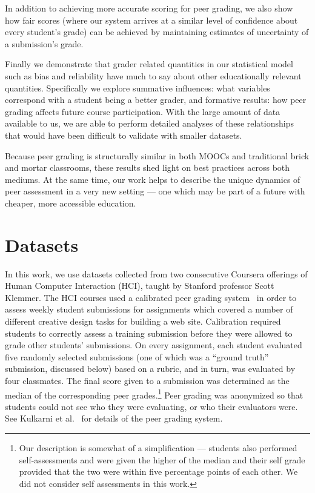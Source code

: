 In addition to achieving more accurate scoring for peer grading, we also show how fair scores
(where our system arrives at a similar level of confidence about every student's grade)
can be achieved by maintaining estimates of uncertainty of a submission's grade.

Finally we demonstrate that grader related quantities in our statistical model such as bias and reliability
have much to say about other educationally relevant quantities. Specifically we explore summative influences: what variables correspond with a student being a better grader, and formative results: how peer grading affects future course participation. With the large amount of data available to us, we are able to perform detailed analyses of these relationships that would have been difficult to validate with smaller datasets.

Because peer grading is structurally similar in both MOOCs and traditional brick and mortar classrooms, these results shed light on best practices across both mediums. At the same time, our work helps to describe the unique dynamics of peer assessment in a very new setting --- one which may be part of a future with cheaper, more accessible education. 

\section{Datasets}\label{sec:datasets}
In this work, we use datasets collected from two 
consecutive Coursera offerings of Human Computer Interaction (HCI), taught by Stanford professor Scott Klemmer.
The HCI courses used a calibrated peer grading system~\cite{russell04} in order to assess weekly student submissions for
assignments which covered a number of different creative design tasks
for building a web site. Calibration required students to correctly assess a training submission before they were allowed
to grade other students' submissions. On every assignment,
each student evaluated five randomly selected submissions
(one of which was a ``ground truth'' submission, discussed below) based on a rubric, and in turn, was evaluated by four
classmates. The final score given to a submission was
determined as the median of the corresponding peer grades.\footnote{
Our description is somewhat of a simplification --- students also performed self-assessments and were given
the higher of the median and their self grade provided that the two were within five percentage points of each other.
We did not consider self assessments in this work.}
Peer grading was anonymized so that students could not see
who they were evaluating, or who their evaluators were.
See Kulkarni et al.~\cite{kulkarni13} for details of the peer grading system.

